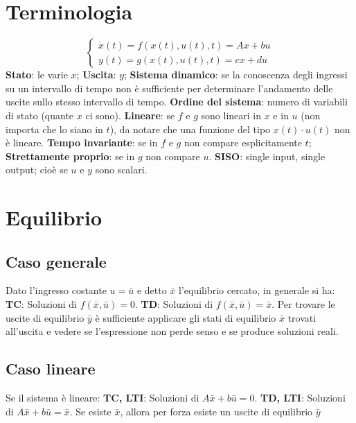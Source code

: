 \fontsize{8pt}{10pt}\selectfont
{}
    \section{Terminologia}
    \[
        \begin{cases}
            \dot{x}(t) = f(x(t),u(t),t) = Ax + bu\\
            y(t) = g(x(t),u(t),t) = cx +du
        \end{cases}
    \]
    \textbf{Stato}: le varie $x$;\newline
    \textbf{Uscita}: $y$;\newline
    \textbf{Sistema dinamico}: se la conoscenza degli ingressi su un intervallo di tempo
    non è sufficiente per determinare l’andamento delle uscite sullo stesso intervallo di tempo.\newline
    \textbf{Ordine del sistema}: numero di variabili di stato (quante $x$ ci sono).\newline
    \textbf{Lineare}: se $f$ e $g$ sono lineari in $x$ e in $u$ (non importa che lo siano in $t$), da notare che una funzione del tipo $x(t) \cdot u(t)$ non è lineare.\newline
    \textbf{Tempo invariante}: se in $f$ e $g$ non compare esplicitamente $t$;\newline
    \textbf{Strettamente proprio}: se in $g$ non compare $u$.\newline
    \textbf{SISO}: single input, single output; cioè se $u$ e $y$ sono scalari.
    \newpage\section{Equilibrio}
    \subsection{Caso generale}
    Dato l'ingresso costante $u = \bar{u}$ e detto $\bar{x}$ l'equilibrio cercato, in generale si ha:\newline
    \textbf{TC}: Soluzioni di $f(\bar{x},\bar{u}) = 0$.\newline
    \textbf{TD}: Soluzioni di $f(\bar{x}, \bar{u}) = \bar{x}$.\newline
    Per trovare le uscite di equilibrio $\bar{y}$ è sufficiente applicare gli stati di equilibrio $\bar{x}$ trovati all'uscita e vedere se l'espressione non perde senso e se produce soluzioni reali.
    \subsection{Caso lineare}
    Se il sistema è lineare:\newline
    \textbf{TC, LTI}: Soluzioni di $A\bar{x} + b \bar{u} = 0$.\newline
    \textbf{TD, LTI}: Soluzioni di $A\bar{x} + b \bar{u} = \bar{x}$.\newline
    Se esiste $\bar{x}$, allora per forza esiste un uscite di equilibrio $\bar{y}$

